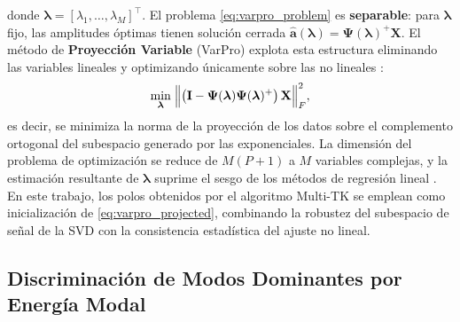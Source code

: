 donde $\boldsymbol{\lambda} = [\lambda_1,\ldots,\lambda_M]^\top$. El
problema \eqref{eq:varpro_problem} es \textbf{separable}: para
$\boldsymbol{\lambda}$ fijo, las amplitudes óptimas tienen solución cerrada
$\hat{\mathbf{a}}(\boldsymbol{\lambda}) =
\boldsymbol{\Psi}(\boldsymbol{\lambda})^{+}\mathbf{X}$. El método de
\textbf{Proyección Variable} (VarPro) explota esta estructura eliminando
las variables lineales y optimizando únicamente sobre las no lineales
\cite{askham2018}:
\begin{equation}
    \min_{\boldsymbol{\lambda}}\;
    \Bigl\lVert
    \bigl(\mathbf{I} - \boldsymbol{\Psi}(\boldsymbol{\lambda})
    \boldsymbol{\Psi}(\boldsymbol{\lambda})^{+}\bigr)\,\mathbf{X}
    \Bigr\rVert_F^2,
    \label{eq:varpro_projected}
\end{equation}
es decir, se minimiza la norma de la proyección de los datos sobre el
complemento ortogonal del subespacio generado por las exponenciales. La
dimensión del problema de optimización se reduce de $M(P+1)$ a $M$
variables complejas, y la estimación resultante de
$\boldsymbol{\lambda}$ suprime el sesgo de los métodos de regresión lineal
\cite{askham2018,brunton2022}. En este trabajo, los polos obtenidos por el
algoritmo Multi-TK se emplean como inicialización de
\eqref{eq:varpro_projected}, combinando la robustez del subespacio de señal
de la SVD con la consistencia estadística del ajuste no lineal.

\subsection{Discriminación de Modos Dominantes por Energía Modal}

